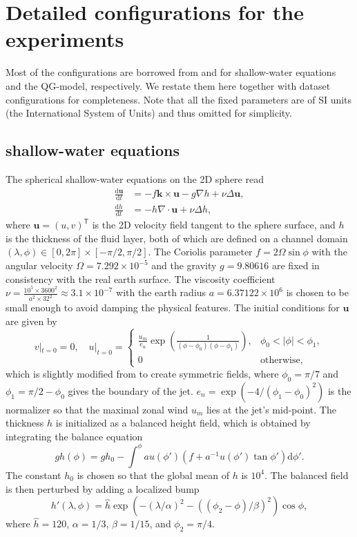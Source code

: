\documentclass{article}
\newcommand{\md}{\mathrm{d}}
\newcommand{\trans}{\mathsf{T}}
\begin{document}
\section{Detailed configurations for the experiments}\label{sec:exp_configs}
Most of the configurations are borrowed from \cite{Galewsky-2004} and \cite{Nicholas2015QGsetting} for shallow-water equations and the QG-model, respectively. We restate them here together with dataset configurations for completeness. Note that all the fixed parameters are of SI units (the International System of Units) and thus omitted for simplicity.
\subsection{shallow-water equations}
The spherical shallow-water equations on the 2D sphere read
\begin{align*}
	\frac{\md\bm u}{\md t} & =-f\bm k\times\bm u-g\nabla h+\nu\Delta\bm u, \\
	\frac{\md h}{\md t}    & =-h\nabla\cdot\bm u+\nu\Delta h,
\end{align*}
where $\bm u=(u,v)^\trans$ is the 2D velocity field tangent to the sphere surface, and $h$ is the thickness of the fluid layer, both of which are defined on a channel domain $(\lambda,\phi)\in[0,2\pi]\times[-\pi/2,\pi/2]$. The Coriolis parameter $f=2\Omega\sin\phi$ with the angular velocity $\Omega=7.292\times10^{-5}$ and the gravity $g=9.80616$ are fixed in consistency with the real earth surface. The viscosity coefficient $\nu=\frac{10^5\times3600^2}{a^2\times32^2}\approx3.1\times10^{-7}$ with the earth radius $a=6.37122\times10^6$ is chosen to be small enough to avoid damping the physical features. The initial conditions for $\bm u$ are given by
\[
	v|_{t=0}=0,\quad u|_{t=0}=
	\begin{cases}
		\frac{u_m}{e_n}\exp\left(\frac1{(\phi-\phi_0)(\phi-\phi_1)}\right), & \phi_0<|\phi|<\phi_1, \\
		0                                                                   & \textrm{otherwise},
	\end{cases}
\]
which is slightly modified from \cite{Galewsky-2004} to create symmetric fields, where $\phi_0=\pi/7$ and $\phi_1=\pi/2-\phi_0$ gives the boundary of the jet. $e_n=\exp(-4/(\phi_1-\phi_0)^2)$ is the normalizer so that the maximal zonal wind $u_m$ lies at the jet's mid-point. The thickness $h$ is initialized as a balanced height field, which is obtained by integrating the balance equation
\[gh(\phi)=gh_0-\int^\phi au(\phi')\left(f+a^{-1}u(\phi')\tan\phi'\right)\md \phi'.\]
The constant $h_0$ is chosen so that the global mean of $h$ is $10^4$. The balanced field is then perturbed by adding a localized bump
\[h'(\lambda,\phi)=\hat h\exp(-(\lambda/\alpha)^2-((\phi_2-\phi)/\beta)^2)\cos\phi,\]
where $\hat h=120$, $\alpha=1/3$, $\beta=1/15$, and $\phi_2=\pi/4$.
\end{document}
